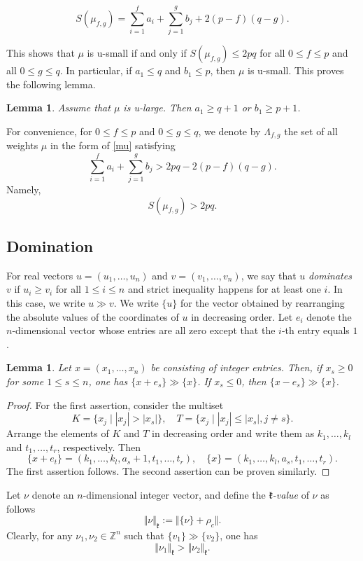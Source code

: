 \documentclass[11pt]{amsart}
\theoremstyle{plain}
\newtheorem{lemma}[thm]{Lemma}
\theoremstyle{definition}
\newcommand{\frk}{\mathfrak{k}}
\newcommand{\bbZ}{\mathbb{Z}}
\begin{document}
\[S(\mu_{f, g})=\sum_{i=1}^f a_i+\sum_{j=1}^g b_j+2(p-f)(q-g).\]

This shows that $\mu$ is u-small if and only if $S(\mu_{f, g})\le 2pq$ for all $0\le f\le p$ and all $0\le g\le q$. In particular, if $a_1\le q$ and $b_1\le p$, then $\mu$ is u-small. This proves the following lemma.

\begin{lemma}\label{lemma-u-large}
	Assume that $\mu$ is u-large. Then $a_1\ge q+1$ or $b_1\ge p+1$.
\end{lemma}

For convenience, for $0\le f\le p$ and $0\le g\le q$, we denote by $\Lambda_{f, g}$ the set of all weights $\mu$ in the form of \eqref{mu} satisfying
\[\sum_{i=1}^f a_i+\sum_{j=1}^g b_j>2pq-2(p-f)(q-g).\]
Namely,
\begin{equation}\label{sum-mufg}
S(\mu_{f, g})> 2pq.
\end{equation}


\subsection{Domination}
For real vectors $u=(u_1,\dots, u_n)$ and $v=(v_1, \dots, v_n)$, we say that $u$ \emph{dominates} $v$ if $u_i\ge v_i$ for all $1\le i\le n$ and  strict inequality happens for at least one $i$. In this case, we write $u\gg v$. We write $\{u\}$ for the vector obtained by rearranging the absolute values of the coordinates of $u$ in decreasing order. Let $e_i$ denote the $n$-dimensional vector whose entries are all zero except that the $i$-th entry equals $1$.

\begin{lemma}\label{lemma-dominat}
Let $x=(x_1,\dots,x_n)$ be consisting of integer entries.   Then, if $x_s \geq 0$ for some $1\le s\le n$, one has $\{x+e_s\}\gg\{x\}$. If $x_s\leq 0$, then $\{x-e_s\}\gg\{x\}$.
\end{lemma}
\begin{proof}
	For the first assertion, consider the multiset
	\[K=\{x_j\mid |x_j|>|x_s|\},\quad T=\{x_j\mid |x_j|\le |x_s|,j\neq s\}.\]
	Arrange the elements of $K$ and $T$ in decreasing order and write them as $k_1,\dots,k_l$ and $t_1,\dots,t_r$,  respectively. Then
	\[\{x+e_t\}=(k_1,\dots,k_l,a_s+1,t_1,\dots,t_r),\quad \{x\}=(k_1,\dots,k_l,a_s,t_1,\dots,t_r).\]
The first assertion follows. The second assertion can be proven similarly.
\end{proof}
Let $\nu$ denote an $n$-dimensional integer vector, and define the \emph{$\frk$-value} of $\nu$ as follows
\[\Vert \nu\Vert_{\frk}:=\Vert\{\nu\}+\rho_c\Vert.\]
Clearly, for any $\nu_1, \nu_2\in\bbZ^n$ such that $\{v_1\}\gg\{v_2\}$, one has
\[\Vert \nu_1\Vert_\frk>\Vert \nu_2\Vert_\frk.\]
\end{document}
